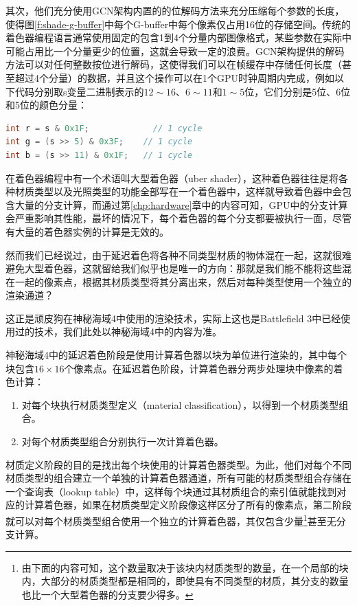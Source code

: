 其次，他们充分使用GCN架构内置的的位解码方法来充分压缩每个参数的长度，使得图\ref{f:shade-g-buffer}中每个G-buffer中每个像素仅占用16位的存储空间。传统的着色器编程语言通常使用固定的包含1到4个分量内部图像格式，某些参数在实际中可能占用比一个分量更少的位置，这就会导致一定的浪费。GCN架构提供的解码方法\cite{a:Low-levelShaderOptimizationforNext-GenandDX11}可以对任何整数按位进行解码，这使得我们可以在帧缓存中存储任何长度（甚至超过4个分量）的数据，并且这个操作可以在1个GPU时钟周期内完成，例如以下代码分别取s变量二进制表示的$12\sim 16$、$6 \sim 11$和$1\sim 5$位，它们分别是5位、6位和5位的颜色分量：

\begin{lstlisting}[language=C++]
int r = s & 0x1F; 			  // 1 cycle
int g = (s >> 5) & 0x3F;	// 1 cycle
int b = (s >> 11) & 0x1F;	// 1 cycle
\end{lstlisting}

在着色器编程中有一个术语叫大型着色器（uber shader），这种着色器往往是将各种材质类型以及光照类型的功能全部写在一个着色器中，这样就导致着色器中会包含大量的分支计算，而通过第\ref{chp:hardware}章中的内容可知，GPU中的分支计算会严重影响其性能，最坏的情况下，每个着色器的每个分支都要被执行一面，尽管有大量的着色器实例的计算是无效的。

然而我们已经说过，由于延迟着色将各种不同类型材质的物体混在一起，这就很难避免大型着色器，这就留给我们似乎也是唯一的方向：那就是我们能不能将这些混在一起的像素点，根据其材质类型将其分离出来，然后对每种类型使用一个独立的渲染通道？

这正是顽皮狗在神秘海域4\cite{a:DeferredLightinginUncharted4}中使用的渲染技术，实际上这也是Battlefield 3\cite{a:SPU-basedDeferredShadingforBattlefield3onPlaystation3}中已经使用过的技术，我们此处以神秘海域4中的内容为准。

神秘海域4中的延迟着色阶段是使用计算着色器以块为单位进行渲染的，其中每个块包含$16\times 16$个像素点。在延迟着色阶段，计算着色器分两步处理块中像素的着色计算：

\begin{enumerate}
	\item 对每个块执行材质类型定义（material classification），以得到一个材质类型组合。
	\item 对每个材质类型组合分别执行一次计算着色器。
\end{enumerate}

材质定义阶段的目的是找出每个块使用的计算着色器类型。为此，他们对每个不同材质类型的组合建立一个单独的计算着色器通道，所有可能的材质类型组合存储在一个查询表（lookup table）中，这样每个块通过其材质组合的索引值就能找到对应的计算着色器，如果在材质类型定义阶段像这样区分了所有的像素点，第二阶段就可以对每个材质类型组合使用一个独立的计算着色器，其仅包含少量\footnote{由下面的内容可知，这个数量取决于该块内材质类型的数量，在一个局部的块内，大部分的材质类型都是相同的，即使具有不同类型的材质，其分支的数量也比一个大型着色器的分支要少得多。}甚至无分支计算。


